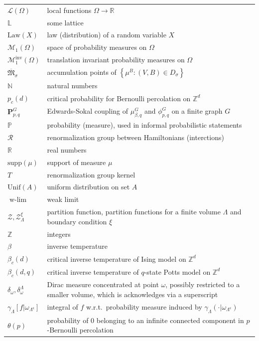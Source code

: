 \documentclass[12pt]{article}
\newcommand{\Loc}{\mathcal{L}}
\renewcommand{\L}{\mathbb{L}}
\newcommand{\M}{\mathcal{M}}
\newcommand{\N}{\mathbb{N}}
\renewcommand{\P}{\mathbb{P}}
\newcommand{\PP}{\mathbf{P}}
\newcommand{\R}{\mathbb{R}}
\newcommand{\RR}{\mathcal{R}}
\newcommand{\Z}{\mathbb{Z}}
\newcommand{\ZZ}{\mathcal{Z}}
\newcommand{\set}[1]{\left\{#1\right\}}
\newcommand{\ra}{\rightarrow}
\newcommand{\pika}{\boldsymbol{\cdot}}
\newcommand{\1}{\mathbbm{1}}
\renewcommand{\c}{\mathsf{c}}
\newcommand{\supp}{\mathrm{supp}}
\newcommand{\5}{\vspace{0.5cm}}
\theoremstyle{definition}
\begin{document}
\begin{tabular}{p{4cm}p{10cm}}
$\Loc(\Omega)$ & local functions $\Omega\ra\R$ \\
$\L$ & some lattice \\
$\mathrm{Law}(X)$ & law (distribution) of a random variable $X$ \\
$\M_1(\Omega)$ & space of probability measures on $\Omega$ \\
$\M_1^{\mathrm{inv}}(\Omega)$ & translation invariant probability measures on $\Omega$ \\
$\overline{\mathfrak{M}}_{\sigma}$ & accumulation points of $\set{\mu^B:(V,B)\in D_\sigma}$ \\
$\N$ & natural numbers \\
$p_c(d)$ & critical probability for Bernoulli percolation on $\Z^d$ \\
$\PP_{p,q}^G$ & Edwards-Sokal coupling of $\mu_{\beta,q}^G$ and $\phi_{p,q}^G$ on a finite graph $G$ \\
$\P$ & probability (measure), used in informal probabilistic statements \\
$\RR$ & renormalization group between Hamiltonians (interctions) \\
$\R$ & real numbers \\
$\supp(\mu)$ & support of measure $\mu$ \\
$T$ & renormalization group kernel \\
$\mathrm{Unif}(A)$ & uniform distribution on set $A$ \\
$\text{w-}\lim$ & weak limit \\
$\ZZ,\ZZ_\Lambda^\xi$ & partition function, partition functions for a finite volume $\Lambda$ and boundary condition $\xi$ \\
$\Z$ & integers \\
$\beta$ & inverse temperature \\
$\beta_c(d)$ & critical inverse temperature of Ising model on $\Z^d$ \\
$\beta_c(d,q)$ & critical inverse temperature of $q$-state Potts model on $\Z^d$ \\
$\delta_\omega,\delta_\omega^\Lambda$ & Dirac measure concentrated at point $\omega$, possibly restricted to a smaller volume, which is acknowledges via a superscript \\
$\gamma_\Lambda[f|\omega_{\Lambda^\c}]$  & integral of $f$ w.r.t.~probability measure induced by $\gamma_\Lambda(\pika|\omega_{\Lambda^\c})$ \\
$\theta(p)$ & probability of $0$ belonging to an infinite connected component in $p$-Bernoulli percolation \\

\end{tabular}
\end{document}
